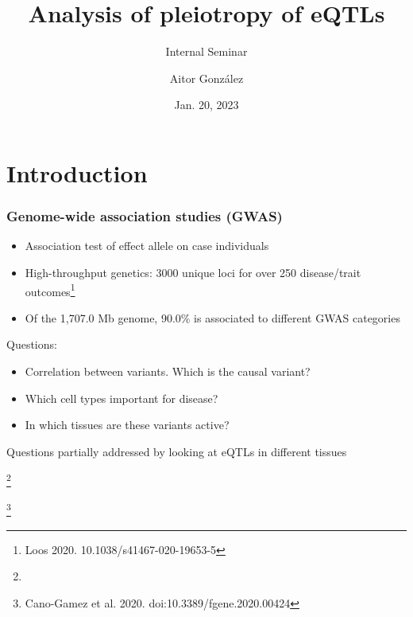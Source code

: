 \documentclass{beamer}
\title{Analysis of pleiotropy of eQTLs}
\subtitle{Internal Seminar}
\author{Aitor Gonz\'alez}
\institute{Aix Marseille Univ, INSERM, TAGC}
\date{Jan. 20, 2023}
\newcommand\blfootnote[1]{%
    \begingroup
    \renewcommand\thefootnote{}\footnote{#1}%
    \addtocounter{footnote}{-1}%
    \endgroup
}
\begin{document}
    \begin{frame}

        \titlepage

    \end{frame}

    \section{Introduction} %

    \begin{frame}
        \frametitle{Genome-wide association studies (GWAS)}

        \begin{itemize}
            \item Association test of effect allele on case individuals
            \item High-throughput genetics: 3000 unique loci for over 250 disease/trait outcomes\footnote{Loos 2020. 10.1038/s41467-020-19653-5}
            \item Of the 1,707.0 Mb genome, 90.0\% is associated to different GWAS categories
        \end{itemize}
%
        \vfill
        Questions:
%
        \begin{itemize}
            \item Correlation between variants. Which is the causal variant?
            \item Which cell types important for disease?
            \item In which tissues are these variants active?
        \end{itemize}
%
        \vfill
%
        Questions partially addressed by looking at eQTLs in different tissues

        \blfootnote{}
        \blfootnote{Cano-Gamez et al. 2020. doi:10.3389/fgene.2020.00424}
    \end{frame}
\end{document}

